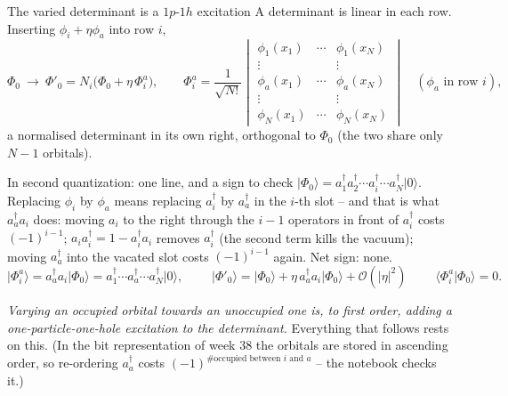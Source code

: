 \documentclass[aspectratio=169,10pt]{beamer}
\newcommand{\ket}[1]{\vert #1\rangle}
\newcommand{\braket}[2]{\langle #1\vert #2\rangle}
\newcommand{\bigO}{\mathcal{O}}
\begin{document}
\begin{frame}[shrink=2]{The varied determinant is a $1p$-$1h$ excitation}
  \footnotesize
  A determinant is linear in each row. Inserting $\phi_i+\eta\phi_a$ into row $i$,
  \[
    \Phi_0\ \longrightarrow\ \Phi'_0=N_i\bigl(\Phi_0+\eta\,\Phi_i^a\bigr),
    \qquad
    \Phi_i^a=\frac{1}{\sqrt{N!}}
    \begin{vmatrix}
      \phi_1(x_1) & \cdots & \phi_1(x_N)\\
      \vdots & & \vdots\\
      \phi_a(x_1) & \cdots & \phi_a(x_N)\\
      \vdots & & \vdots\\
      \phi_N(x_1) & \cdots & \phi_N(x_N)
    \end{vmatrix}
    \quad(\phi_a\text{ in row }i),
  \]
  a normalised determinant in its own right, orthogonal to $\Phi_0$ (the two share only $N-1$ orbitals).
  \begin{block}{In second quantization: one line, and a sign to check}
    $\ket{\Phi_0}=a_1^{\dagger}a_2^{\dagger}\cdots a_i^{\dagger}\cdots a_N^{\dagger}\ket{0}$. Replacing $\phi_i$ by $\phi_a$ means replacing $a_i^{\dagger}$ by $a_a^{\dagger}$ in the $i$-th slot -- and that is what $a_a^{\dagger}a_i$ does: moving $a_i$ to the right through the $i-1$ operators in front of $a_i^{\dagger}$ costs $(-1)^{i-1}$; $a_ia_i^{\dagger}=1-a_i^{\dagger}a_i$ removes $a_i^{\dagger}$ (the second term kills the vacuum); moving $a_a^{\dagger}$ into the vacated slot costs $(-1)^{i-1}$ again. Net sign: none.
    \[
      \ket{\Phi_i^a}=a_a^{\dagger}a_i\ket{\Phi_0}=a_1^{\dagger}\cdots a_a^{\dagger}\cdots a_N^{\dagger}\ket{0},
      \qquad
      \boxed{\;\ket{\Phi'_0}=\ket{\Phi_0}+\eta\,a_a^{\dagger}a_i\ket{\Phi_0}+\bigO(|\eta|^2)\;}
      \qquad\braket{\Phi_i^a}{\Phi_0}=0 .
    \]
  \end{block}
  {\scriptsize\emph{Varying an occupied orbital towards an unoccupied one is, to first order, adding a one-particle-one-hole excitation to the determinant.} Everything that follows rests on this. (In the bit representation of week 38 the orbitals are stored in ascending order, so re-ordering $a_a^{\dagger}$ costs $(-1)^{\#\text{occupied between }i\text{ and }a}$ -- the notebook checks it.)}
\end{frame}
\end{document}
